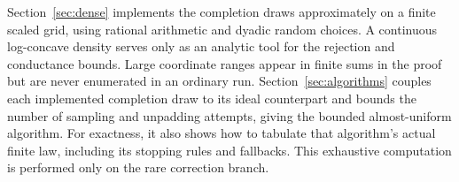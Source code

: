 Section~\ref{sec:dense} implements the completion draws approximately on
a finite scaled grid, using rational arithmetic and dyadic random choices.
A continuous log-concave density serves only as an analytic tool for the
rejection and conductance bounds. Large coordinate ranges appear in
finite sums in the proof but are never enumerated in an ordinary run.
Section~\ref{sec:algorithms} couples each implemented completion draw to
its ideal counterpart and bounds the number of sampling and unpadding
attempts, giving the bounded almost-uniform algorithm. For exactness,
it also shows how to tabulate that algorithm's actual finite law,
including its stopping rules and fallbacks. This exhaustive computation
is performed only on the rare correction branch.


